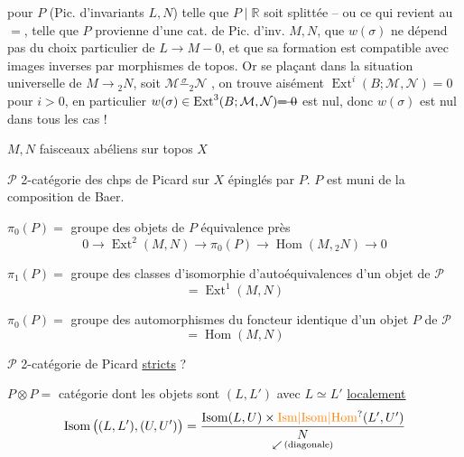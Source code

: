 pour  $P$ (Pic. d'invariants $L,N$) telle
que $P\mid\mathbb{R}$ soit splittée -- ou ce qui revient au
$=$, telle que $P$ provienne d'une cat. de Pic.
d'inv. $M,N$,  
que $w(\sigma)$ ne dépend pas du choix particulier
de $L\to M\mathbin{-}0$, et que sa formation est
 compatible avec  images inverses
par morphismes de topos. Or se plaçant
dans la situation universelle de $M\to{}_{2}N$,
 soit $\mathcal{M}\mathrel{\overset{\sigma}{-}}{}_{2}\mathcal{N}$ , on trouve
aisément $\operatorname{Ext}^{i}(B;\mathcal{M},\mathcal{N})=0$ pour $i>0$,
en particulier $w(\sigma)\in\operatorname{Ext}^{3}(B;\mathcal{M},\mathcal{N})\deleted{=0}$
est nul, donc $w(\sigma)$ est nul dans tous les
cas !

$M,N$ faisceaux abéliens sur topos $X$

$\mathscr{P}$ 2-catégorie des chps de Picard sur $X$
épinglés par $P$. $P$ est muni de
la composition de Baer.

$\pi_0(P)=$ groupe des objets de $P$  équivalence
près
\[
0\to\operatorname{Ext}^{2}(M,N)\to\pi_0(P)\to\operatorname{Hom}(M,{}_{2}N)\to0
\]

$\pi_1(P)=$ groupe des classes d'isomorphie
d'autoéquivalences d'un objet de
$\mathscr{P}$
\[
=\operatorname{Ext}^{1}(M,N)
\]

$\pi_0(P)=$ groupe des automorphismes du
foncteur identique d'un
objet $P$ de $\mathscr{P}$
\[
=\operatorname{Hom}(M,N)
\]

$\mathscr{P}$ 2-catégorie de Picard \uline{stricts} ?

$P\otimes P=$ catégorie dont les objets sont
$(L,L')$ avec  $L\simeq L'$ \uline{localement}
\[
\operatorname{Isom}\big((L,L'),(U,U')\big)=
\frac{\operatorname{Isom}(L,U)\times\operatorname{\unsure{Ism|Isom|Hom}}(L',U')}{\underset{\swarrow\,(\text{diagonale})}{N}}
\]

